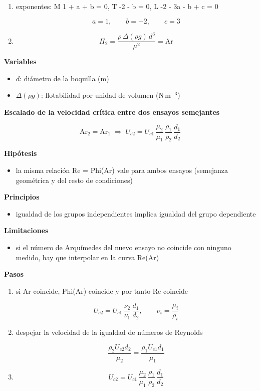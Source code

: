 \documentclass[10pt,openany]{book}
\begin{document}
\begin{tcolorbox}[title={Desarrollos del modelo}, studiumdef, breakable]
\begin{enumerate}
\[
\Pi_2 = \Delta(\rho g)\,\rho^{a}\mu^{b}d^{c}
\]
\item
exponentes: M 1 + a + b = 0, T -2 - b = 0, L -2 - 3a - b + c = 0

\[
a = 1,\qquad b = -2,\qquad c = 3
\]
\item

\[
\Pi_2 = \frac{\rho\,\Delta(\rho g)\,d^{3}}{\mu^{2}} = \mathrm{Ar}
\]
\end{enumerate}

\noindent\textbf{Variables}
\begin{itemize}
\item $d$: diámetro de la boquilla ($\mathrm{m}$)
\item $\Delta(\rho g)$: flotabilidad por unidad de volumen ($\mathrm{N}\,\mathrm{m}^{-3}$)
\end{itemize}



\noindent\textbf{Escalado de la velocidad crítica entre dos ensayos semejantes}

\begin{equation}
\mathrm{Ar}_2 = \mathrm{Ar}_1 \;\Rightarrow\; U_{c2} = U_{c1}\,\frac{\mu_2}{\mu_1}\,\frac{\rho_1}{\rho_2}\,\frac{d_1}{d_2}
\label{eq:c10-escalado-flotabilidad}
\end{equation}

\noindent\textbf{Hipótesis}
\begin{itemize}
\item la misma relación Re = Phi(Ar) vale para ambos ensayos (semejanza geométrica y del resto de condiciones)
\end{itemize}

\noindent\textbf{Principios}
\begin{itemize}
\item igualdad de los grupos independientes implica igualdad del grupo dependiente
\end{itemize}

\noindent\textbf{Limitaciones}
\begin{itemize}
\item si el número de Arquímedes del nuevo ensayo no coincide con ninguno medido, hay que interpolar en la curva Re(Ar)
\end{itemize}

\noindent\textbf{Pasos}
\begin{enumerate}
\item
si Ar coincide, Phi(Ar) coincide y por tanto Re coincide

\[
U_{c2} = U_{c1}\,\frac{\nu_2}{\nu_1}\,\frac{d_1}{d_2},\qquad \nu_i=\frac{\mu_i}{\rho_i}
\]
\item
despejar la velocidad de la igualdad de números de Reynolds

\[
\frac{\rho_2 U_{c2} d_2}{\mu_2} = \frac{\rho_1 U_{c1} d_1}{\mu_1}
\]
\item

\[
U_{c2} = U_{c1}\,\frac{\mu_2}{\mu_1}\,\frac{\rho_1}{\rho_2}\,\frac{d_1}{d_2}
\]
\end{enumerate}


\end{tcolorbox}
\end{document}
